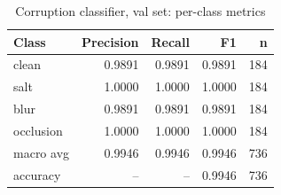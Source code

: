 \begin{table}[t]
\centering
\caption{Corruption classifier, val set: per-class metrics}
\label{tab:t2_clf_val}
\begin{tabular}{lrrrr}
\toprule
Class & Precision & Recall & F1 & n \\
\midrule
clean & 0.9891 & 0.9891 & 0.9891 & 184 \\
salt & 1.0000 & 1.0000 & 1.0000 & 184 \\
blur & 0.9891 & 0.9891 & 0.9891 & 184 \\
occlusion & 1.0000 & 1.0000 & 1.0000 & 184 \\
macro avg & 0.9946 & 0.9946 & 0.9946 & 736 \\
accuracy & -- & -- & 0.9946 & 736 \\
\bottomrule
\end{tabular}
\end{table}

